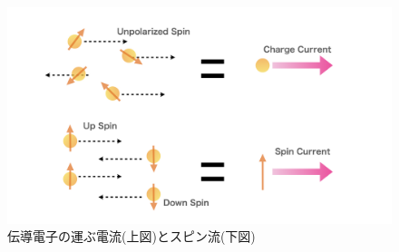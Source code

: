 \documentclass[dvipdfmx,11pt]{jsreport}
\numberwithin{equation}{chapter}
\numberwithin{table}{chapter}
\begin{document}
\begin{figure}[H]
	\centering
	\includegraphics[width=\textwidth]{fig/fig.005.jpeg}
	\caption{伝導電子の運ぶ電流(上図)とスピン流(下図)}
	\label{fig:fig-fig-005-jpeg}
\end{figure}
\end{document}
